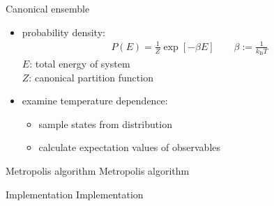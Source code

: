 \documentclass[mathserif,serif]{beamer}
\begin{document}
\begin{frame}{Canonical ensemble}
	\begin{itemize}
		\setlength\itemsep{2.0em}
		\item probability density:
		\begin{align*}
			P(E) = \frac{1}{Z} \exp\left[ - \beta E \right] \qquad \beta := \frac{1}{k_\mathrm{B} T}
		\end{align*}
		$E$: total energy of system\\
		$Z$: canonical partition function
		
		\item examine temperature dependence:
		\begin{itemize}
			\item sample states from distribution
			\item calculate expectation values of observables
		\end{itemize}
	\end{itemize}
\end{frame}

\begin{frame}{Metropolis algorithm}
	Metropolis algorithm

\end{frame}

\begin{frame}{Implementation}
	Implementation
\end{frame}















\end{document}
